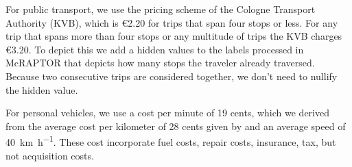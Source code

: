 For public transport, we use the pricing scheme of the Cologne Transport Authority (KVB), which is \euro{2.20} for trips that span four stops or less.
For any trip that spans more than four stops or any multitude of trips the KVB charges \euro{3.20}.
To depict this we add a hidden values to the labels processed in McRAPTOR that depicts how many stops the traveler already traversed.
Because two consecutive trips are considered together, we don't need to nullify the hidden value.

For personal vehicles, we use a cost per minute of 19 cents, which we derived from the average cost per kilometer of 28 cents given by \cite{kieferSpritkostenrechner2023} and an average speed of \SI{40}{\kilo\meter\per\hour}.
These cost incorporate fuel costs, repair costs, insurance, tax, but not acquisition costs.

